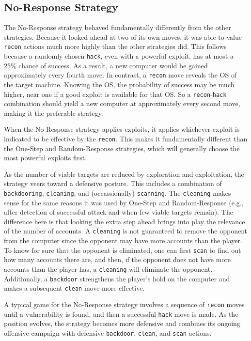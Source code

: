 \documentclass{sig-alternate}
\begin{document}
\subsection{No-Response Strategy}
The No-Response strategy behaved fundamentally differently from the other strategies.
Because it looked ahead at two of its own moves, it was able to value {\tt recon} actions much more highly than the other strategies did.
This follows because a randomly chosen {\tt hack}, even with a powerful exploit, has at most a 25\% chance of success.
As a result, a new computer would be gained approximately every fourth move.
In contrast, a {\tt recon} move reveals the OS of the target machine.
Knowing the OS, the probability of success may be much higher, near one if a good exploit is available for that OS.
So a {\tt recon}-{\tt hack} combination should yield a new computer at approximately every second move, making it the preferable strategy.

When the No-Response strategy applies exploits, it applies whichever exploit is indicated to be effective by the {\tt recon}.
This makes it fundamentally different than the One-Step and Random-Response strategies, which will generally choose the most powerful exploits first.

As the number of viable targets are reduced by exploration and exploitation, the strategy veers toward a defensive posture.
This includes a combination of {\tt backdooring}, {\tt cleaning}, and (occassionally) {\tt scanning}.
The {\tt cleaning} makes sense for the same reasons it was used by One-Step and Random-Response (e.g., after detection of successful attack and when few viable targets remain).
The difference here is that looking the extra step ahead brings into play the relevance of the number of accounts.
A {\tt cleaning} is not guaranteed to remove the opponent from the computer since the opponent may have more accounts than the player.
To know for sure that the opponent is eliminated, one can first {\tt scan} to find out how many accounts there are, and then, if the opponent does not have more accounts than the player has, a {\tt cleaning} will eliminate the opponent.
Additionally, a {\tt backdoor} strengthens the player's hold on the computer and makes a subsequent {\tt clean} move more effective.

A typical game for the No-Response strategy involves a sequence of {\tt recon} moves until a vulnerability is found, and then a successful {\tt hack} move is made.
As the position evolves, the strategy becomes more defensive and combines its ongoing offensive campaign with defensive {\tt backdoor}, {\tt clean}, and  {\tt scan} actions.
\end{document}

